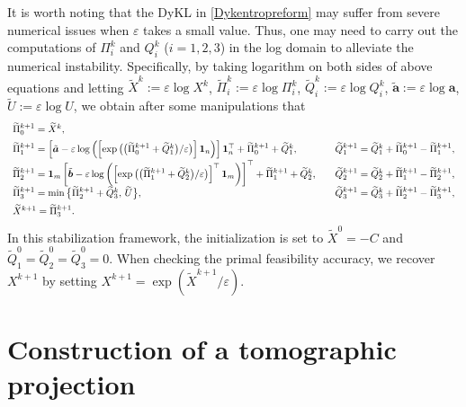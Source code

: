 \documentclass[10pt]{article}
\begin{document}
\begin{appendices}
It is worth noting that the DyKL in \eqref{Dykentropreform} may suffer from severe numerical issues when $\varepsilon$ takes a small value. Thus, one may need to carry out the computations of $\Pi^k_i$ and $Q^k_i$ ($i=1,2,3$) in the log domain to alleviate the numerical instability. Specifically, by taking logarithm on both sides of above equations and letting $\widetilde{X}^k:=\varepsilon\log X^k$, $\widetilde{\Pi}^k_i:=\varepsilon\log \Pi^k_i$, $\widetilde{Q}^k_i:=\varepsilon\log Q^k_i$, $\tilde{\bm{a}}:=\varepsilon\log\bm{a}$, $\widetilde{U}:=\varepsilon\log U$, we obtain after some manipulations that
\begin{equation}\label{Dykentropreformstable}
\begin{array}{llll}
\widetilde{\Pi}^{k+1}_0 = \widetilde{X}^{k}, \\[5pt]
\widetilde{\Pi}^{k+1}_1 = \left[\tilde{\bm{a}}-\varepsilon\log\left(\left[\exp\big{(}\big{(}\widetilde{\Pi}^{k+1}_0 + \widetilde{Q}^{k}_1\big{)}/\varepsilon\big{)}\right]\bm{1}_n\right)\right]\bm{1}_n^{\top} + \widetilde{\Pi}^{k+1}_0 + \widetilde{Q}^{k}_1,  \quad
&\widetilde{Q}^{k+1}_1 = \widetilde{Q}^{k}_1 + \widetilde{\Pi}^{k+1}_0 - \widetilde{\Pi}^{k+1}_1, \\[5pt]
\widetilde{\Pi}^{k+1}_2 = \bm{1}_m\left[\tilde{\bm{b}} - \varepsilon\log\left(\left[\exp\big{(}\big{(}\widetilde{\Pi}^{k+1}_1+\widetilde{Q}^{k}_2\big{)}/\varepsilon\big{)}\right]^{\top}\bm{1}_m\right)\right]^{\top} + \widetilde{\Pi}^{k+1}_1 + \widetilde{Q}^{k}_2, \quad
&\widetilde{Q}^{k+1}_2 = \widetilde{Q}^{k}_2 + \widetilde{\Pi}^{k+1}_1 - \widetilde{\Pi}^{k+1}_2, \\[5pt]
\widetilde{\Pi}^{k+1}_3 = \min\big{\{}\widetilde{\Pi}^{k+1}_2 + \widetilde{Q}^{k}_3, \,\widetilde{U}\big{\}}, \quad
&\widetilde{Q}^{k+1}_3 = \widetilde{Q}^{k}_3 + \widetilde{\Pi}^{k+1}_2 - \widetilde{\Pi}^{k+1}_3, \\[5pt]
\widetilde{X}^{k+1} = \widetilde{\Pi}^{k+1}_3.
\end{array}
\end{equation}
In this stabilization framework, the initialization is set to $\widetilde{X}^{0}=-C$ and $\widetilde{Q}^{0}_1=\widetilde{Q}^{0}_2=\widetilde{Q}^{0}_3=0$. When checking the primal feasibility accuracy, we recover $X^{k+1}$ by setting $X^{k+1} = \exp(\widetilde{X}^{k+1}/\varepsilon)$.





\section{Construction of a tomographic projection}\label{appen3}



\end{appendices}
\end{document}
